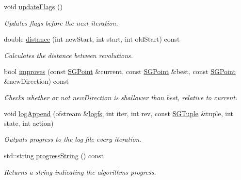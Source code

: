 \begin{DoxyCompactItemize}
void \hyperlink{classSGApprox_a93455458a21bdeccff21a6163932c38a}{update\-Flags} ()
\begin{DoxyCompactList}\small\item\em Updates flags before the next iteration. \end{DoxyCompactList}\item 
double \hyperlink{classSGApprox_a78d8cbb1e3727aef21d4666164a21207}{distance} (int new\-Start, int start, int old\-Start) const 
\begin{DoxyCompactList}\small\item\em Calculates the distance between revolutions. \end{DoxyCompactList}\item 
bool \hyperlink{classSGApprox_aa251718a9291407cc4e758253c6d29ea}{improves} (const \hyperlink{classSGPoint}{S\-G\-Point} \&current, const \hyperlink{classSGPoint}{S\-G\-Point} \&best, const \hyperlink{classSGPoint}{S\-G\-Point} \&new\-Direction) const 
\begin{DoxyCompactList}\small\item\em Checks whether or not new\-Direction is shallower than best, relative to current. \end{DoxyCompactList}\item 
\hypertarget{classSGApprox_a91be640b991ff44b56359cbe3a2b00d5}{void \hyperlink{classSGApprox_a91be640b991ff44b56359cbe3a2b00d5}{log\-Append} (ofstream \&\hyperlink{classSGApprox_aa95ff6bda46617fbaa7cf1c8d6708748}{logfs}, int iter, int rev, const \hyperlink{classSGTuple}{S\-G\-Tuple} \&tuple, int state, int action)}\label{classSGApprox_a91be640b991ff44b56359cbe3a2b00d5}

\begin{DoxyCompactList}\small\item\em Outputs progress to the log file every iteration. \end{DoxyCompactList}\item 
\hypertarget{classSGApprox_a55e023f8f5c0c6cf906999c0682d6765}{std\-::string \hyperlink{classSGApprox_a55e023f8f5c0c6cf906999c0682d6765}{progress\-String} () const }\label{classSGApprox_a55e023f8f5c0c6cf906999c0682d6765}

\begin{DoxyCompactList}\small\item\em Returns a string indicating the algorithms progress. \end{DoxyCompactList}\end{DoxyCompactItemize}
